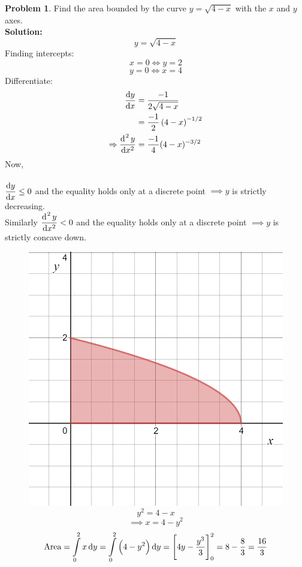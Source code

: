 \documentclass[14]{article}
\theoremstyle{definition}
\newtheorem{prob}{Problem}
\theoremstyle{case}
\begin{document}
\begin{prob}
Find the area bounded by the curve $y = \sqrt{4-x}$ with the $x$ and $y$ axes.\\
\textbf{Solution:}
\[y = \sqrt{4-x}\]
Finding intercepts:
\[x = 0 \iff y = 2\]
\[y = 0 \iff x = 4\]
Differentiate:
\begin{align*}
\dfrac{\dif y}{\dif x} &= \dfrac{-1}{2\sqrt{4-x}}\\
&= \dfrac{-1}{2} \left( 4-x \right)^{-1/2}\\
\Rightarrow \dfrac{\dif^{\;2} y}{\dif x^2} &= \dfrac{-1}4 (4-x)^{-3/2}
\end{align*}
Now,\\\\
$\dfrac{\dif y}{\dif x} \leq 0$ and the equality holds only at a discrete point $\implies y$ is strictly decreasing.\\
Similarly $\dfrac{\dif^{\;2}y}{\dif x^2} < 0$ and the equality holds only at a discrete point $\implies y$ is strictly concave down.
\begin{figure}[h]
\centering
\includegraphics[scale=.3]{images/area4-x}
\[y^2 = 4-x\]
\[\implies x = 4-y^2\]
\[\text{Area} = \int\limits_0^2 x \dif y = \int\limits_0^2 \left( 4 - y^2\right) \dif y = \left[4y - \dfrac{y^3}{3} \right]_0^2 = 8 - \dfrac83 = \dfrac{16}3\]
\end{figure}
\end{prob}
\end{document}
